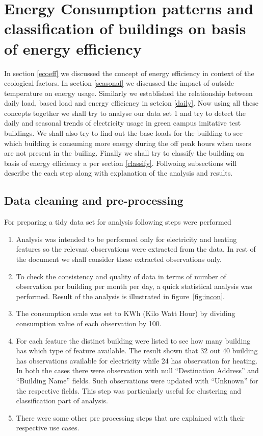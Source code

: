 \section{Energy Consumption patterns and classification of buildings on basis of energy efficiency}
In section \ref{ecoeff} we discussed the concept of energy efficiency in context of the ecological factors. In section \ref{seasonal} we discussed the impact of outside temperature on energy usage. Similarly we established the relationship between daily load, based load and energy efficiency in setcion \ref{daily}. Now using all these concepts together we shall try to analyse our data set 1 and try to detect the daily and seasonal trends of electricity usage in green campus imitative  test buildings. We shall also try to find out the base loads for the building to see which building is consuming more energy during the off peak hours when users are not present in the builing. Finally we shall try to classify the building on basis of energy efficiency a per section \ref{classify}. Follwoing subsections will describe the each step along with explanation of the analysis and results.
\subsection{Data cleaning and pre-processing} 
For preparing a tidy data set for analysis following steps were performed
\begin{enumerate}
\item Analysis was intended to be performed only for electricity and heating features so the relevant observations were extracted from the data. In rest of the document we shall consider these extracted observations only.
\item To check the consistency and quality of data in terms of number of observation per building per month per day, a quick statistical analysis was performed. Result of the analysis is illustrated in figure~\ref{fig:incon}.
\item The consumption scale was set to KWh (Kilo Watt Hour) by dividing consumption value of each observation by 100.
\item For each feature the distinct building were listed to see how many building has which type of feature available. The result shown that 32 out 40 building has observations available for electricity while 24 has observation for heating. In both the cases there were observation with null ``Destination Address'' and ``Building Name'' fields. Such observations were updated with ``Unknown'' for the respective fields. This step was particularly useful for clustering and classification part of analysis.
\item There were some other pre processing steps that are explained with their respective use cases.
\end{enumerate}

